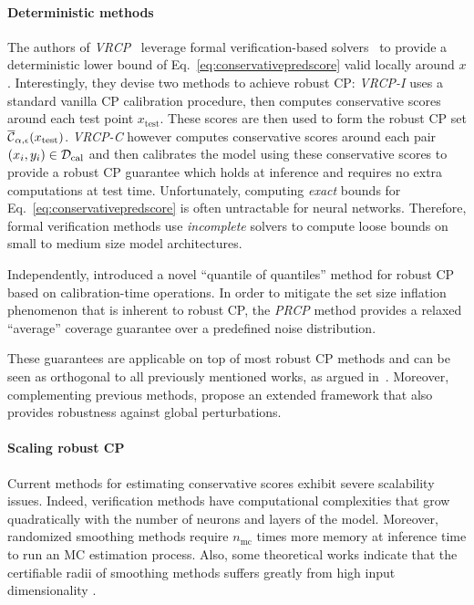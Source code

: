 \paragraph{Deterministic methods} The authors of \emph{VRCP}~\cite{vrcp}
leverage formal verification-based solvers~\cite{katz2017reluplexefficientsmtsolver} to provide a deterministic lower bound of Eq.~\eqref{eq:conservativepredscore} valid locally around $x$. Interestingly, they devise two methods to achieve robust CP: \emph{VRCP-I} uses a standard vanilla CP calibration procedure, then computes conservative scores around each test point $x_\mathrm{test}$. These scores are then used to form the robust CP set $\overline{\mathcal{C}}_{\alpha, \epsilon}(x_\mathrm{test})$. \emph{VRCP-C} however computes conservative scores around each pair $(x_i,y_i) \in \mathcal{D}_\mathrm{cal}$ and then calibrates the model using these conservative scores to provide a robust CP guarantee which holds at inference and requires no extra computations at test time.
Unfortunately, computing \textit{exact} bounds for Eq.~\eqref{eq:conservativepredscore} is often untractable for neural networks. Therefore, formal verification methods use \textit{incomplete} solvers to compute loose bounds on small to medium size model architectures.


Independently, \citet{prcp} introduced a novel ``quantile of quantiles'' method for robust CP based on calibration-time operations. 
In order to mitigate the set size inflation phenomenon that is inherent to robust CP, the \emph{PRCP} method provides a relaxed ``average''  coverage guarantee over a predefined noise distribution.

These guarantees are applicable on top of most robust CP methods and can be seen as orthogonal to all previously mentioned works, as argued in~\citet{cas}. Moreover, complementing previous methods, \citet{aolaritei2025conformal} propose an extended framework that also provides robustness against global perturbations.

\paragraph{Scaling robust CP} Current methods for estimating conservative scores exhibit severe scalability issues. Indeed, verification methods have computational complexities that grow quadratically with the number of neurons and layers of the model. Moreover, randomized smoothing methods require $n_\mathrm{mc}$ times more memory at inference time to run an MC estimation process. Also, some theoretical works indicate that the certifiable radii of smoothing methods suffers greatly from high input dimensionality \cite{wu2024augmentsmoothreconcilingdifferential}. 

